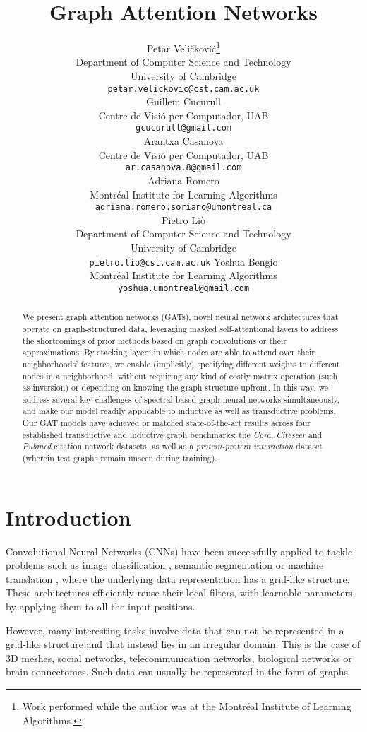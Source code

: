 \documentclass{article} \usepackage{iclr2018_conference,times}
\title{Graph Attention Networks}
\author{Petar Veli\v{c}kovi\'{c}\thanks{Work performed while the author was at the Montr\'{e}al Institute of Learning Algorithms.} \\
Department of Computer Science and Technology\\
University of Cambridge\\
\texttt{petar.velickovic@cst.cam.ac.uk} \\
\And
Guillem Cucurull\\
Centre de Visi\'{o} per Computador, UAB \\
\texttt{gcucurull@gmail.com} \\
\And
Arantxa Casanova\\
Centre de Visi\'{o} per Computador, UAB \\
\texttt{ar.casanova.8@gmail.com} \\
\And
Adriana Romero \\
Montr\'{e}al Institute for Learning Algorithms \\
\texttt{adriana.romero.soriano@umontreal.ca} \\
\And
Pietro Li\`{o} \\
Department of Computer Science and Technology \\
University of Cambridge\\
\texttt{pietro.lio@cst.cam.ac.uk}
\And 
Yoshua Bengio\\
Montr\'{e}al Institute for Learning Algorithms\\
\texttt{yoshua.umontreal@gmail.com}
}
\begin{document}
\maketitle

\begin{abstract}
We present graph attention networks (GATs), novel neural network architectures that operate on graph-structured data, leveraging masked self-attentional layers to address the shortcomings of prior methods based on graph convolutions or their approximations. By stacking layers in which nodes are able to attend over their neighborhoods' features, we enable (implicitly) specifying different weights to different nodes in a neighborhood, without requiring any kind of costly matrix operation (such as inversion) or depending on knowing the graph structure upfront. In this way, we address several key challenges of spectral-based graph neural networks simultaneously, and make our model readily applicable to inductive as well as transductive problems. Our GAT models have achieved or matched state-of-the-art results across four established transductive and inductive graph benchmarks: the \emph{Cora}, \emph{Citeseer}  and \emph{Pubmed} citation network datasets, as well as a \emph{protein-protein interaction} dataset (wherein test graphs remain unseen during training).
\end{abstract}

\section{Introduction}
\label{sec:intro}

Convolutional Neural Networks (CNNs) have been successfully applied to tackle problems such as image classification \citep{he2016deep}, semantic segmentation \citep{Jegou17} or machine translation \citep{GehringAGD16}, where the underlying data representation has a grid-like structure. These architectures efficiently reuse their local filters, with learnable parameters, by applying them to all the input positions.

However, many interesting tasks involve data that can not be represented in a grid-like structure and that instead lies in an irregular domain. This is the case of 3D meshes, social networks, telecommunication networks, biological networks or brain connectomes. Such data can usually be represented in the form of graphs. 
\end{document}
